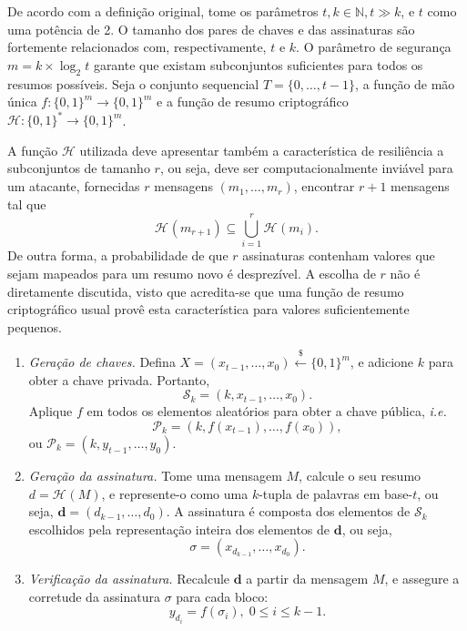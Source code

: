 \documentclass{ufsctex/ufsctex}
\newcommand{\hh}{\mathcal{H}}
\newcommand{\pk}{\mathcal{P}_k}
\newcommand{\sk}{\mathcal{S}_k}
\newcommand{\hash}[2][]{\mathcal{H}^{#1} (#2)}
\newcommand{\binwds}[1]{\{0, 1\}^{#1}}
\newcommand{\fhash}[1]{\hh{}: \binwds{*} \longrightarrow{} \binwds{#1}}
\newcommand{\random}{\stackrel{\$}{\longleftarrow}}
\begin{document}
De acordo com a definição original, tome os parâmetros $t, k \in \mathbb{N}, t
\gg k$, e $t$ como uma potência de 2.  O tamanho dos pares de chaves e das
assinaturas são fortemente relacionados com, respectivamente, $t$ e $k$. O
parâmetro de segurança $m = k \times \log_2 t$ garante que existam subconjuntos
suficientes para todos os resumos possíveis. Seja o conjunto sequencial $T =
\{0, \dots, t - 1\}$, a função de mão única $f : \binwds{m} \longrightarrow
\binwds{m}$ e a função de resumo criptográfico $\fhash{m}$.

A função $\hh{}$ utilizada deve apresentar também a característica de
resiliência a subconjuntos de tamanho $r$, ou seja, deve ser computacionalmente
inviável para um atacante, fornecidas $r$ mensagens $(m_1, \dots, m_r)$,
encontrar $r + 1$ mensagens tal que
\begin{equation}
  \hash{m_{r + 1}} \subseteq \bigcup^{r}_{i = 1} \hash{m_i}.
\end{equation}
De outra forma, a probabilidade de que $r$ assinaturas contenham valores
que sejam mapeados para um resumo novo é desprezível. A escolha de $r$ não
é diretamente discutida, visto que acredita-se que uma função de resumo
criptográfico usual provê esta característica para valores suficientemente
pequenos.

\begin{enumerate}

  \item[] \emph{Geração de chaves.} Defina $X = (x_{t - 1}, \dots, x_0)
      \random{} \binwds{m}$, e adicione $k$ para
        obter a chave privada. Portanto,
        \begin{equation}
          \sk{} = (k, x_{t - 1}, \dots, x_0).
        \end{equation}
        Aplique $f$ em todos os elementos aleatórios para obter a chave
        pública, \emph{i.e.}
        \begin{equation}
          \pk{} = (k, f(x_{t - 1}), \dots, f(x_0)),
        \end{equation}
        ou $\pk{} = (k, y_{t - 1}, \dots, y_0)$.

  \item[] \emph{Geração da assinatura.} Tome uma mensagem $M$, calcule o seu
      resumo $d = \hash{M}$, e represente-o como uma $k$-tupla de palavras em
        base-$t$, ou seja, $\mathbf{d} = (d_{k - 1}, \dots, d_0)$. A assinatura
        é composta dos elementos de $\sk{}$ escolhidos pela representação
        inteira dos elementos de $\mathbf{d}$, ou seja,
        \begin{equation}
          \sigma = (x_{d_{k - 1}}, \dots, x_{d_{0}}).
        \end{equation}

  \item[] \emph{Verificação da assinatura.} Recalcule $\mathbf{d}$ a partir da
      mensagem $M$, e assegure a corretude da assinatura $\sigma$ para cada
        bloco:
        \begin{equation}
          y_{d_{i}} = f(\sigma_{i}), \; 0 \leq i \leq k - 1.
        \end{equation}

\end{enumerate}
\end{document}
